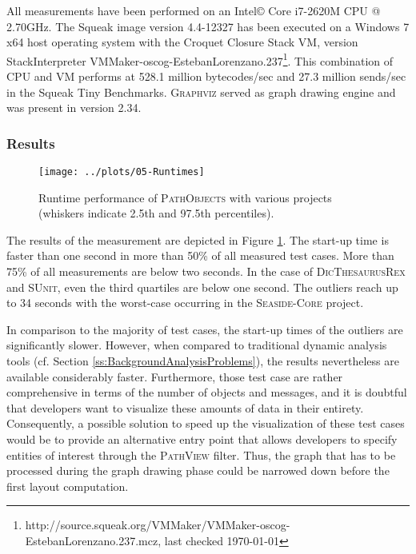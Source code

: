 All measurements have been performed on an Intel\copyright{} Core\texttrademark{}  i7-2620M CPU @ 2.70GHz.
The Squeak image version 4.4-12327 has been executed on a Windows 7 x64 host operating system with the Croquet Closure Stack VM, version StackInterpreter VMMaker-oscog-EstebanLorenzano.237\footnote{http://source.squeak.org/VMMaker/VMMaker-oscog-EstebanLorenzano.237.mcz, last checked \today}. 
This combination of CPU and VM performs at 528.1 million bytecodes/sec and 27.3 million sends/sec in the Squeak Tiny Benchmarks. \textsc{Graphviz} served as graph drawing engine and was present in version 2.34.

\subsubsection{Results}

\begin{figure}[tb!]
	\centering
	\texttt{[image: ../plots/05-Runtimes]}
	\caption[Runtime Performance of \textsc{PathObjects}]{Runtime performance of \textsc{PathObjects} with various projects (whiskers indicate 2.5th and 97.5th percentiles).}
	\label{f:DiscussionRuntime}
\end{figure}

The results of the measurement are depicted in Figure \ref{f:DiscussionRuntime}.
The start-up time is faster than one second in more than 50\% of all measured test cases.
More than 75\% of all measurements are below two seconds.
In the case of \textsc{DicThesaurusRex} and \textsc{SUnit}, even the third quartiles are below one second.
The outliers reach up to 34 seconds with the worst-case occurring in the \textsc{Seaside-Core} project.

In comparison to the majority of test cases, the start-up times of the outliers are significantly slower.
However, when compared to traditional dynamic analysis tools (cf. Section \ref{ss:BackgroundAnalysisProblems}), the results nevertheless are available considerably faster.
Furthermore, those test case are rather comprehensive in terms of the number of objects and messages, and it is doubtful that developers want to visualize these amounts of data in their entirety.
Consequently, a possible solution to speed up the visualization of these test cases would be to provide an alternative entry point that allows developers to specify entities of interest through the \textsc{PathView} filter.
Thus, the graph that has to be processed during the graph drawing phase could be narrowed down before the first layout computation.

